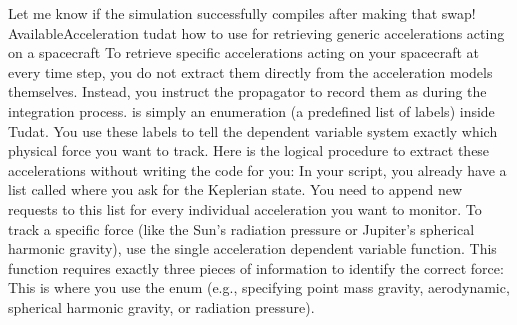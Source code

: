 {}Let me know if the simulation successfully compiles after making that swap!\markdownRendererInterblockSeparator
{}\markdownRendererThematicBreak{}\markdownRendererInterblockSeparator
{}
\markdownRendererSectionEnd 
\markdownRendererSectionEnd \markdownRendererSectionBegin
{}\markdownRendererInterblockSeparator
{}AvailableAcceleration tudat how to use for retrieving generic accelerations acting on a spacecraft\markdownRendererInterblockSeparator
{}
\markdownRendererSectionEnd \markdownRendererSectionBegin
{}\markdownRendererInterblockSeparator
{}To retrieve specific accelerations acting on your spacecraft at every time step, you do not extract them directly from the acceleration models themselves. Instead, you instruct the propagator to record them as  during the integration process.\markdownRendererInterblockSeparator
{} is simply an enumeration (a predefined list of labels) inside Tudat. You use these labels to tell the dependent variable system exactly which physical force you want to track.\markdownRendererInterblockSeparator
{}Here is the logical procedure to extract these accelerations without writing the code for you:\markdownRendererInterblockSeparator
{}\markdownRendererSectionBegin
{}\markdownRendererInterblockSeparator
{}In your script, you already have a list called  where you ask for the Keplerian state. You need to append new requests to this list for every individual acceleration you want to monitor.\markdownRendererInterblockSeparator
{}
\markdownRendererSectionEnd \markdownRendererSectionBegin
{}\markdownRendererInterblockSeparator
{}To track a specific force (like the Sun's radiation pressure or Jupiter's spherical harmonic gravity), use the single acceleration dependent variable function. This function requires exactly three pieces of information to identify the correct force:\markdownRendererInterblockSeparator
{}\markdownRendererUlBegin
\markdownRendererUlItem {} This is where you use the  enum (e.g., specifying point mass gravity, aerodynamic, spherical harmonic gravity, or radiation pressure).\markdownRendererUlItemEnd 
